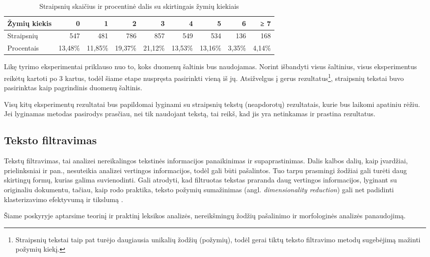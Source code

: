 \documentclass{VUMIFInfBakalaurinis}
\begin{document}
\begin{table}[H]
  \centering
  \caption{Straipsnių skaičius ir procentinė dalis su skirtingais žymių kiekiais}
  \begin{tabular}{|l|r|r|r|r|r|r|r|r|}
  \hline
  Žymių kiekis & 0       & 1       & 2       & 3       & 4       & 5       & 6      & ≥ 7    \\ \hline
  Straipsnių   & 547     & 481     & 786     & 857     & 549     & 534     & 136    & 168    \\ \hline
  Procentais   & 13,48\% & 11,85\% & 19,37\% & 21,12\% & 13,53\% & 13,16\% & 3,35\% & 4,14\% \\ \hline
  \end{tabular}
  \end{table}

Likę tyrimo eksperimentai priklauso nuo to, koks duomenų šaltinis bus
naudojamas. Norint išbandyti visus šaltinius, visus eksperimentus
reikėtų kartoti po 3 kartus, todėl šiame etape nuspręsta pasirinkti
vieną iš jų. Atsižvelgus į gerus rezultatus\footnote{Straipsnių tekstai
  taip pat turėjo daugiausia unikalių žodžių (požymių), todėl gerai
  tiktų teksto filtravimo metodų sugebėjimą mažinti požymių kiekį.},
straipsnių tekstai buvo pasirinktas kaip pagrindinis duomenų šaltinis.

Visų kitų eksperimentų rezultatai bus papildomai lyginami su straipsnių
tekstų (neapdorotų) rezultatais, kurie bus laikomi apatiniu rėžiu. Jei
lyginamas metodas pasirodys prasčiau, nei tik naudojant tekstą, tai
reikš, kad jis yra netinkamas ir prastina rezultatus.

\subsection{Teksto filtravimas}

Tekstų filtravimas, tai analizei nereikalingos tekstinės informacijos
panaikinimas ir supaprastinimas. Dalis kalbos dalių, kaip
įvardžiai, prielinksniai ir pan., nesuteikia analizei vertingos
informacijos, todėl gali būti pašalintos. Tuo tarpu prasmingi žodžiai
gali turėti daug skirtingų formų, kurias galima suvienodinti. Gali
atrodyti, kad filtruotas tekstas praranda daug vertingos informacijos,
lyginant su originaliu dokumentu, tačiau, kaip rodo praktika, teksto
požymių sumažinimas (angl. \emph{dimensionality reduction}) gali net
padidinti klasterizavimo efektyvumą ir tikslumą \cite{mugunthadevi2011survey}.

Šiame poskyryje aptarsime teorinį ir praktinį leksikos analizės,
nereikšmingų žodžių pašalinimo ir morfologinės analizės panaudojimą.
\end{document}
